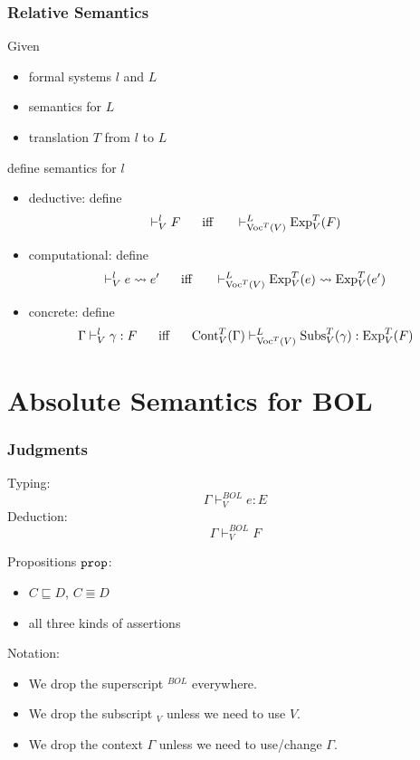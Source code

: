 \begin{frame}\frametitle{Relative Semantics}
Given
 \begin{itemize}
 \item formal systems $l$ and $L$
 \item semantics for $L$
 \item translation $T$ from $l$ to $L$
 \end{itemize}
define semantics for $l$
\medskip

\begin{itemize}
\item deductive: define
 \[\vdash^l_V F \hspace*{.5cm}\;\mathrm{iff}\;\hspace*{.5cm} \vdash^L_{\mathrm{Voc}^T(V)} \mathrm{Exp}^T_V(F) \]
\item computational: define
 \[\vdash^l_V e\rightsquigarrow e' \hspace*{.5cm}\;\mathrm{iff}\;\hspace*{.5cm} \vdash^L_{\mathrm{Voc}^T(V)}\mathrm{Exp}^T_V(e)\rightsquigarrow \mathrm{Exp}^T_V(e')\]
\item concrete: define
 \[\Gamma\vdash^l_V \gamma:F \hspace*{.5cm}\;\mathrm{iff}\;\hspace*{.5cm} \mathrm{Cont}^T_V(\Gamma)\vdash^L_{\mathrm{Voc}^T(V)}\mathrm{Subs}^T_V(\gamma):\mathrm{Exp}^T_V(F)\]
\end{itemize}
\end{frame}

\section{Absolute Semantics for BOL}

\begin{frame}\frametitle{Judgments}
Typing:  \[\Gamma\vdash^{BOL}_V e:E\]
Deduction: \[\Gamma\vdash^{BOL}_V F\]

Propositions $\prop$:
\begin{itemize}
\item $C\sqsubseteq D$, $C\Equiv D$
\item all three kinds of assertions
\end{itemize}

Notation:
\begin{itemize}
\item We drop the superscript $^{BOL}$ everywhere.
\item We drop the subscript $_V$ unless we need to use $V$.
\item We drop the context $\Gamma$ unless we need to use/change $\Gamma$.
\end{itemize}
\end{frame}

